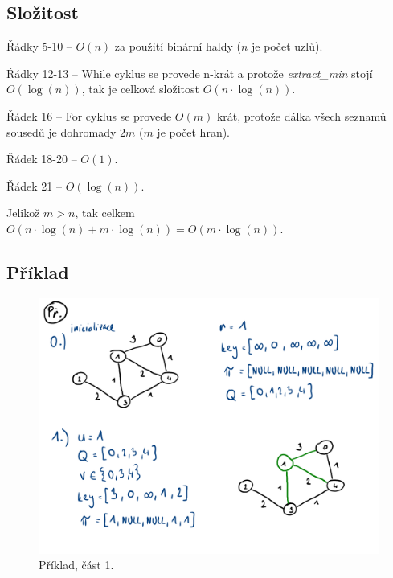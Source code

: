 \subsection{Složitost}

\begin{compactitem}
    \item Řádky 5-10 -- $O(n)$ za použití binární haldy ($n$ je počet uzlů).
    \item Řádky 12-13 -- While cyklus se provede n-krát a protože \textit{extract\_min} stojí $O(\log(n))$, tak je celková složitost $O(n \cdot \log(n))$.
    \item Řádek 16 -- For cyklus se provede $O(m)$ krát, protože dálka všech seznamů sousedů je dohromady $2m$ ($m$ je počet hran).
    \item Řádek 18-20 -- $O(1)$.
    \item Řádek 21 -- $O(\log(n))$.
    \item Jelikož $m > n$, tak celkem $O(n \cdot \log(n) + m \cdot \log(n)) = O(m \cdot \log(n))$.
\end{compactitem}

\subsection{Příklad}

\begin{figure}[H]
    \centering
    \includegraphics[width=0.9\linewidth]{03-minimalni-kostry-16.pdf}
    \caption{Příklad, část 1.}
\end{figure}

